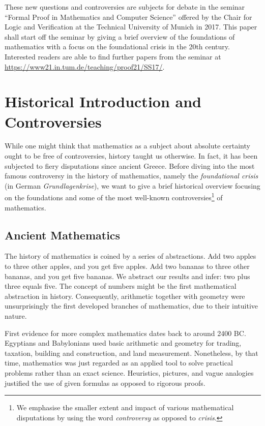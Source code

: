 \documentclass{article}
\begin{document}
These new questions and controversies are subjects for debate in the seminar ``Formal Proof in Mathematics and Computer Science'' offered by the Chair for Logic and Verification at the Technical University of Munich in 2017. This paper shall start off the seminar by giving a brief overview of the foundations of mathematics with a focus on the foundational crisis in the 20th century. Interested readers are able to find further papers from the seminar at \url{https://www21.in.tum.de/teaching/proof21/SS17/}.
\newpage
{}
\tableofcontents
{}
\newpage

\section{Historical Introduction and Controversies}
While one might think that mathematics as a subject about absolute certainty ought to be free of controversies, history taught us otherwise. In fact, it has been subjected to fiery disputations since ancient Greece. Before diving into the most famous controversy in the history of mathematics, namely the \textit{foundational crisis} (in German \textit{Grundlagenkrise}), we want to give a brief historical overview focusing on the foundations and some of the most well-known controversies\footnote{We emphasise the smaller extent and impact of various mathematical disputations by using the word \textit{controversy} as opposed to \textit{crisis}.} of mathematics.

\subsection{Ancient Mathematics}

The history of mathematics is coined by a series of abstractions.
Add two apples to three other apples, and you get five apples. Add two bananas to three other bananas, and you get five bananas. We abstract our results and infer: two plus three equals five. The concept of numbers might be the first mathematical abstraction in history. Consequently, arithmetic together with geometry were unsurprisingly the first developed branches of mathematics, due to their intuitive nature.

First evidence for more complex mathematics dates back to around 2400 BC\@. Egyptians and Babylonians used basic arithmetic and geometry for trading, taxation, building and construction, and land measurement. Nonetheless, by that time, mathematics was just regarded as an applied tool to solve practical problems rather than an exact science. Heuristics, pictures, and vague analogies justified the use of given formulas as opposed to rigorous proofs.
\end{document}
